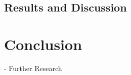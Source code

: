 \documentclass[tuberlin,cic,tc,openright,english,noabntcite,oneside]{iiufrgs}
\begin{document}
\section{Results and Discussion}

\chapter{Conclusion}
- Further Research

% 

% 

\nocite{*}
%
\printbibliography
\end{document}
